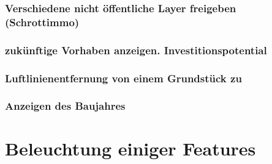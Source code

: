 \subsubsection{Verschiedene nicht öffentliche Layer freigeben (Schrottimmo)}
\subsubsection{zukünftige Vorhaben anzeigen. Investitionspotential}
\subsubsection{Luftlinienentfernung von einem Grundstück zu}
\subsubsection{Anzeigen des Baujahres}



\section{Beleuchtung einiger Features}

